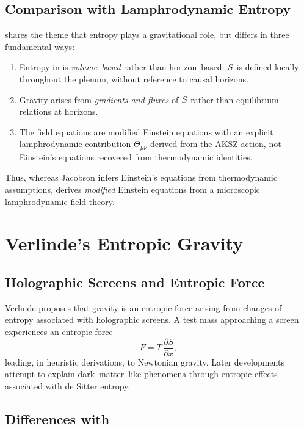 \subsection{Comparison with Lamphrodynamic Entropy}

\rsvpabbr{} shares the theme that entropy plays a gravitational role, but
differs in three fundamental ways:
\begin{enumerate}
\item Entropy in \rsvpabbr{} is \emph{volume--based} rather than
horizon--based: $S$ is defined locally throughout the plenum, without
reference to causal horizons.
\item Gravity arises from \emph{gradients and fluxes} of $S$ rather
than equilibrium relations at horizons.
\item The field equations are modified Einstein equations with an explicit
lamphrodynamic contribution $\Theta_{\mu\nu}$ derived from the AKSZ action, not
Einstein's equations recovered from thermodynamic identities.
\end{enumerate}

Thus, whereas Jacobson infers Einstein's equations from thermodynamic
assumptions, \rsvpabbr{} derives \emph{modified} Einstein equations from a
microscopic lamphrodynamic field theory.

\section{Verlinde's Entropic Gravity}
\label{sec:verlinde}

\subsection{Holographic Screens and Entropic Force}

Verlinde proposes that gravity is an entropic force arising from changes of
entropy associated with holographic screens. A test mass approaching a screen
experiences an entropic force
\[
  F = T\,\frac{\partial S}{\partial x},
\]
leading, in heuristic derivations, to Newtonian gravity. Later developments
attempt to explain dark--matter--like phenomena through entropic effects
associated with de Sitter entropy.

\subsection{Differences with \rsvpabbr{}}


